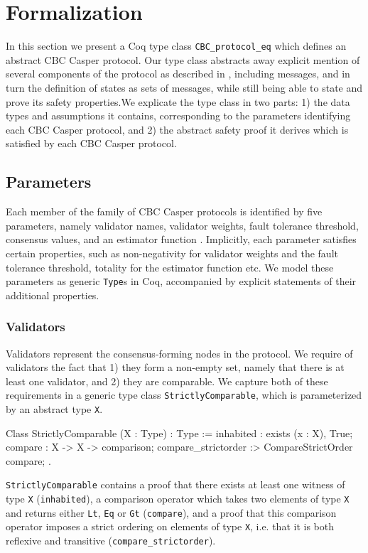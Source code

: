 \documentclass[runningheads]{llncs}
\begin{document}
\section{Formalization}
\label{sec:formalization}
In this section we present a Coq type class \verb|CBC_protocol_eq| which defines an abstract CBC Casper protocol. Our type class abstracts away explicit mention of several components of the protocol as described in \cite{CBCfull}, including messages, and in turn the definition of states as sets of messages, while still being able to state and prove its safety properties.We explicate the type class in two parts: 1) the data types and assumptions it contains, corresponding to the parameters identifying each CBC Casper protocol, and 2) the abstract safety proof it derives which is satisfied by each CBC Casper protocol.

\subsection{Parameters} 
Each member of the family of CBC Casper protocols is identified by five parameters, namely validator names, validator weights, fault tolerance threshold, consensus values, and an estimator function \cite{CBCfull}. Implicitly, each parameter satisfies certain properties, such as non-negativity for validator weights and the fault tolerance threshold, totality for the estimator function etc. We model these parameters as generic \verb|Type|s in Coq, accompanied by explicit statements of their additional properties. 

\subsubsection{Validators} 
Validators represent the consensus-forming nodes in the protocol. We require of validators the fact that 1) they form a non-empty set, namely that there is at least one validator, and 2) they are comparable. We capture both of these requirements in a generic type class \verb|StrictlyComparable|, which is parameterized by an abstract type \verb|X|. 
\begin{coq}
	Class StrictlyComparable (X : Type) : Type :=
	{
	inhabited : exists (x : X), True;
	compare : X -> X -> comparison;
	compare_strictorder :> CompareStrictOrder compare;
	}.
\end{coq}
\verb|StrictlyComparable| contains a proof that there exists at least one witness of type \verb|X| (\verb|inhabited|), a comparison operator which takes two elements of type \verb|X| and returns either \verb|Lt|, \verb|Eq| or \verb|Gt| (\verb|compare|), and a proof that this comparison operator imposes a strict ordering on elements of type \verb|X|, i.e. that it is both reflexive and transitive (\verb|compare_strictorder|). 
\end{document}
